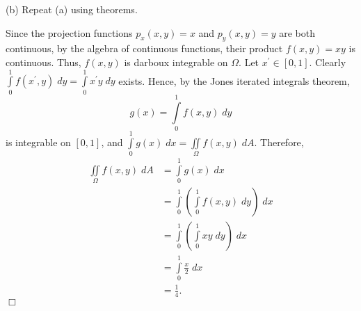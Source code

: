 \documentclass[11pt]{article}
\begin{document}
\noindent (b) Repeat (a) using theorems.

\vspace{.1in}

\noindent Since the projection functions $p_x(x,y)=x$ and $p_y(x,y)=y$ are both continuous, by the algebra of continuous functions, their product $f(x,y)=xy$ is continuous. Thus, $f(x,y)$ is darboux integrable on $\Omega$. Let $x^{'}\in [0,1]$. Clearly $\int\limits_0^1f(x^{'},y)\;dy=\int\limits_0^1x^{'}y\;dy$ exists. Hence, by the Jones iterated integrals theorem, 
\[
g(x)=\int\limits_0^1f(x,y)\;dy
\]
\noindent is integrable on $[0,1]$, and $\int\limits_0^1g(x)\;dx=\iint\limits_\Omega f(x,y)\;dA$. Therefore,
\begin{align*}
\iint\limits_\Omega f(x,y)\;dA&=\int\limits_0^1g(x)\;dx\\&=\int\limits_0^1\left(\int\limits_0^1f(x,y)\;dy\right)\;dx\\&=\int\limits_0^1\left(\int\limits_0^1xy\;dy\right)\;dx\\&=\int\limits_0^1\frac{x}{2}\;dx\\&=\frac{1}{4}.
\end{align*}
\hfill $\Box$
\end{document}

